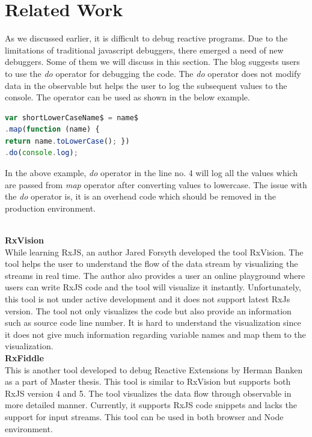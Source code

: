 \section{Related Work}
As we discussed earlier, it is difficult to debug reactive programs. Due to the limitations of traditional javascript debuggers, there emerged a need of new debuggers. Some of them we will discuss in this section. The blog\cite{debugrxjsblog} suggests users to use the \textit{do} operator for debugging the code. The \textit{do} operator does not modify data in the observable but helps the user to log the subsequent values to the console. The operator can be used as shown in the below example.
\begin{lstlisting}[language=JavaScript, caption=Do operator usage, label={lst:do-operator-example}]
var shortLowerCaseName$ = name$
.map(function (name) {
return name.toLowerCase(); })
.do(console.log);
\end{lstlisting}

In the above example, \textit{do} operator in the line no. 4 will log all the values which are passed from \textit{map} operator after converting values to lowercase. The issue with the \textit{do} operator is, it is an overhead code which should be removed in the production environment. 

\leavevmode
\\
\textbf{RxVision}
\\
While learning RxJS, an author Jared Forsyth developed the tool RxVision\cite{rxvision}. The tool helps the user to understand the flow of the data stream by visualizing the streams in real time. The author also provides a user an online playground where users can write RxJS code and the tool will visualize it instantly\cite{rxvisionplayground}. Unfortunately, this tool is not under active development and it does not support latest RxJs version. The tool not only visualizes the code but also provide an information such as source code line number. It is hard to understand the visualization since it does not give much information regarding variable names and map them to the visualization. 
\leavevmode
\\
\textbf{RxFiddle}
\\
This is another tool developed to debug Reactive Extensions by Herman Banken as a part of Master thesis\cite{rxfiddle}.  
This tool is similar to RxVision but supports both RxJS version 4 and 5. The tool visualizes the data flow through observable in more detailed manner. 
Currently, it supports RxJS code snippets and lacks the support for input streams\cite{rxfiddle}. This tool can be used in both browser and Node environment.  

